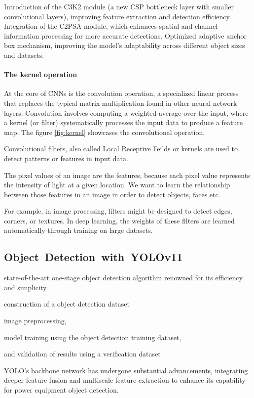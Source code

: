 \documentclass[a4paper,10pt,twocolumn]{article}
\numberwithin{figure}{section}
\numberwithin{table}{section}
\begin{document}
Introduction of the C3K2 module (a new CSP bottleneck layer with smaller convolutional layers), improving feature extraction and detection efficiency.
Integration of the C2PSA module, which enhances spatial and channel information processing for more accurate detections.
Optimized adaptive anchor box mechanism, improving the model's adaptability across different object sizes and datasets.


\paragraph{The kernel operation}
At the core of CNNs is the convolution operation, a specialized linear process that replaces 
the typical matrix multiplication found in other neural network layers. Convolution involves 
computing a weighted average over the input, where a kernel (or filter) systematically processes
 the input data to produce a feature map. The figure \ref{fig:kernel} showcases the convolutional 
 operation.


Convolutional filters, also called Local Receptive Feilds or kernels are used
to detect patterns or features in input data. 

The pixel values of an image are the features, because each pixel value represents the intensity of light at a given location. We want to learn the relationship between those features in an image in order to detect objects, faces etc. 

For example, in image processing, filters might be designed to detect edges, 
corners, or textures. In deep learning, the weights of these filters are learned automatically through training on large datasets.






\subsection{\mbox{Object Detection with YOLOv11}}


state-of-the-art one-stage object detection algorithm 
renowned for its efficiency and simplicity

construction of a object detection dataset

image preprocessing, 

model training using the object detection training dataset,

and validation of results using a verification dataset

YOLO’s backbone network has undergone
substantial advancements, integrating deeper feature fusion
and multiscale feature extraction to enhance its capability for
power equipment object detection. 
\end{document}
